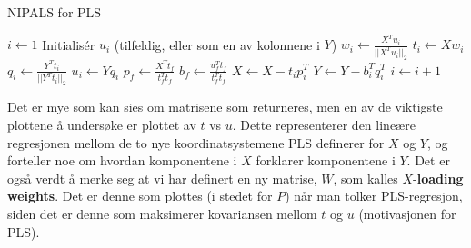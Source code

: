 \begin{algorithm}
	\caption{NIPALS for PLS}\label{alg:nipals_pls} \begin{algorithmic}[1] 
	\State $i \gets 1$
	\State Initialisér $u_i$ (tilfeldig, eller som en av kolonnene i $Y$)
	\State $w_i \gets \frac{X^T u_i}{|| X^T u_i ||_2}$ 
	\State $t_i \gets X w_i$ 
	\State $q_i \gets \frac{Y^T t_i}{|| Y^T t_i ||_2}$ 
	\State $u_i \gets Y q_i$ 
	\EndWhile
	\State $p_f \gets \frac{X^T t_f}{t_f^T t_f}$
	\State $b_f \gets \frac{u_f^T t_f}{t_f^T t_f}$
	\State $X \gets X - t_i p_i^T$ 
	\State $Y \gets Y - b_i^T q_i^T$ 
	\State $i \gets i + 1$
	\EndWhile
\EndProcedure
\end{algorithmic}
\end{algorithm}
Det er mye som kan sies om matrisene som returneres, men en av de viktigste plottene å undersøke er plottet av $t$ vs $u$. Dette representerer den lineære regresjonen mellom de to nye koordinatsystemene PLS definerer for $X$ og $Y$, og forteller noe om hvordan komponentene i $X$ forklarer komponentene i $Y$. Det er også verdt å merke seg at vi har definert en ny matrise, $W$, som kalles $X$-\textbf{loading weights}. Det er denne som plottes (i stedet for $P$) når man tolker PLS-regresjon, siden det er denne som maksimerer kovariansen mellom $t$ og $u$ (motivasjonen for PLS).  

